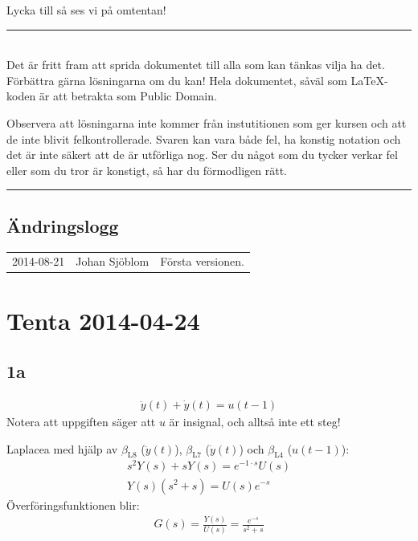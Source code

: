 \documentclass[a4paper]{article}
\newcommand{\mhb}[1]{$\beta_{\text{#1}}$}     %
\newcommand{\horrule}[1]{\rule{\linewidth}{#1}} %
\begin{document}
Lycka till så ses vi på omtentan!
\\[3mm]
\horrule{0.5pt} \\[3mm] %

Det är fritt fram att sprida dokumentet till alla som kan tänkas vilja ha det. Förbättra gärna lösningarna om du kan! Hela dokumentet, såväl som \LaTeX{}-koden är att betrakta som Public Domain.

Observera att lösningarna inte kommer från instutitionen som ger kursen och att de inte blivit felkontrollerade. Svaren kan vara både fel, ha konstig notation och det är inte säkert att de är utförliga nog. Ser du något som du tycker verkar fel eller som du tror är konstigt, så har du förmodligen rätt.
\\[3mm]
\horrule{2pt} %


\subsection*{Ändringslogg}
\begin{tabular}{l l p{7cm}}
  2014-08-21 & Johan Sjöblom & Första versionen.
\end{tabular}



\newpage
\tableofcontents
\newpage


\section{Tenta 2014-04-24}
\subsection{1a}
\begin{align*}
  \ddot{y}(t) + \dot{y}(t) = u(t - 1)
\end{align*}
Notera att uppgiften säger att $u$ är insignal, och alltså inte ett steg!

Laplacea med hjälp av \mhb{L8} ($\ddot{y}(t)$), \mhb{L7} ($\dot{y}(t)$) och \mhb{L4} ($u(t - 1)$):
\begin{align*}
  s^2Y(s) + sY(s) = e^{-1 \cdot s}U(s) \\
  Y(s)(s^2 + s) = U(s)e^{-s}
\end{align*}
Överföringsfunktionen blir:
\begin{align*}
  G(s) = \frac{Y(s)}{U(s)} = \frac{e^{-s}}{s^2 + s}
\end{align*}
\end{document}
